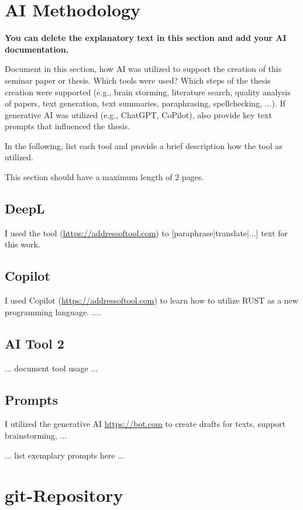 \begin{appendices}


\section{AI Methodology}

\textbf{You can delete the explanatory text in this section and add your AI documentation.}

Document in this section, how AI was utilized to support the creation of this seminar paper or thesis. Which tools were used? Which steps of the thesis creation were supported (e.g., brain storming, literature search, quality analysis of papers, text generation, text summaries, paraphrasing, spellchecking, ...). If generative AI was utilized (e.g., ChatGPT, CoPilot), also provide key text prompts that influenced the thesis. 

In the following, list each tool and provide a brief description how the tool as utilized. 

This section should have a maximum length of 2 pages.

\subsection{DeepL}
I used the tool (\url{https://addressoftool.com}) to [paraphrase|translate|...] text for this work.

\subsection{Copilot}
I used Copilot (\url{https://addressoftool.com}) to learn how to utilize RUST as a new programming language. .... 

\subsection{AI Tool 2}
... document tool usage ...

\subsection{Prompts}
I utilized the generative AI \url{https://bot.com} to create drafts for texts, support brainstorming, ...

... list exemplary prompts here ...

\section{git-Repository}


\end{appendices}

